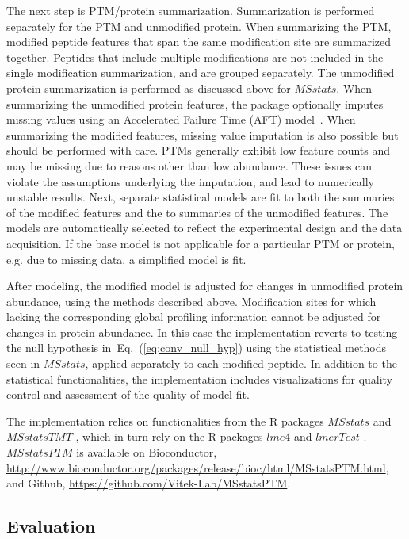 \documentclass[mcp]{article}
\numberwithin{table}{section}
\def\eqref#1{Eq.~(\ref{eq:#1})}
\begin{document}
The next step is PTM/protein summarization. Summarization is performed separately for the PTM and unmodified protein. When summarizing the PTM, modified peptide features that span the same modification site are summarized together. Peptides that include multiple modifications are not included in the single modification summarization, and are grouped separately. The unmodified protein summarization is performed as discussed above for $MSstats$. When summarizing the unmodified protein features, the package optionally imputes missing values using an Accelerated Failure Time (AFT) model~\cite{Wei:1992}. When summarizing the modified features, missing value imputation is also possible but should be performed with care. PTMs generally exhibit low feature counts and may be missing due to reasons other than low abundance. These issues can violate the assumptions underlying the imputation, and lead to numerically unstable  results. Next, separate statistical models are fit to both the summaries of the modified features and the to summaries of the unmodified features. The models are automatically selected to reflect the experimental design and the data acquisition. If the base model is not applicable for a particular PTM or protein, e.g. due to missing data, a simplified model is fit. 

After modeling, the modified model is adjusted for changes in unmodified protein abundance, using the methods described above. Modification sites for which lacking the corresponding global profiling information cannot be adjusted for changes in protein abundance. In this case the implementation reverts to testing the null hypothesis in~\eqref{conv_null_hyp} using the statistical methods seen in $MSstats$, applied separately to each modified peptide. In addition to the statistical functionalities, the implementation includes visualizations for quality control and assessment of the quality of model fit.

The implementation relies on functionalities from the R packages $MSstats$ \cite{Choi:2014} and $MSstatsTMT$ \cite{Huang:2020}, which in turn rely on the R packages $lme4$ \cite{Bates2015} and $lmerTest$ \cite{Kuznetsova2017}. $MSstatsPTM$ is available on Bioconductor, \url{http://www.bioconductor.org/packages/release/bioc/html/MSstatsPTM.html}, and Github, \url{https://github.com/Vitek-Lab/MSstatsPTM}.

\subsection*{Evaluation}
\end{document}
